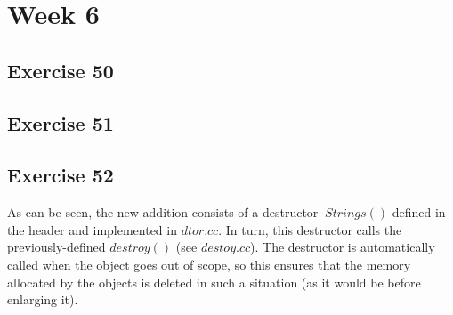 \documentclass[a4paper]{article}
\let\stdsection\section
\renewcommand\section{\newpage\stdsection}
\begin{document}
\section*{Week 6}

\subsection*{Exercise 50}

\newpage
\subsection*{Exercise 51}


\newpage
\subsection*{Exercise 52}
As can be seen, the new addition consists of a destructor $~Strings()$ defined in the header and implemented in $dtor.cc$. In turn, this destructor calls the previously-defined $destroy()$ (see $destoy.cc$). The destructor is automatically called when the object goes out of scope, so this ensures that the memory allocated by the objects is deleted in such a situation (as it would be before enlarging it).



\end{document}
